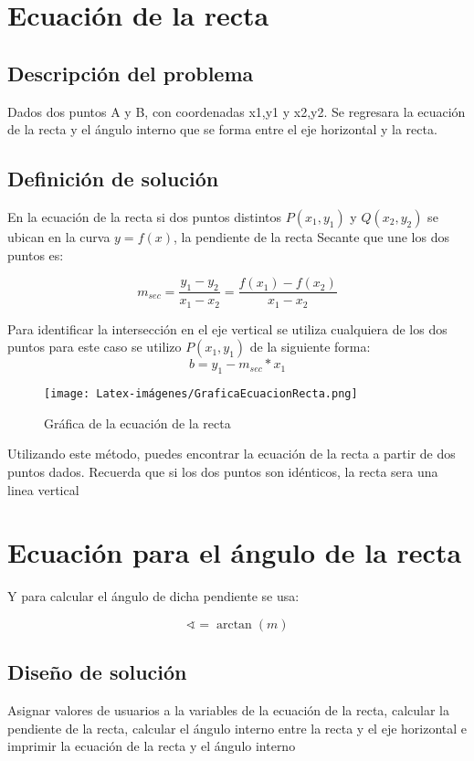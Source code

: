 \section{Ecuación de la recta }
\subsection{Descripción del problema}
Dados dos puntos A y B, con coordenadas x1,y1 y x2,y2. Se regresara la ecuación de la recta y el ángulo interno que se forma entre el eje horizontal y la recta.
\subsection{Definición de solución}
En la ecuación de la recta si dos puntos distintos $P(x_{1},y_{1})$ y $Q(x_{2},y_{2})$ se ubican en la curva $y=f(x)$, la pendiente de la recta Secante que une los dos puntos es:

\begin{equation}
    m_{sec} = \frac{y_{1}-y_{2}}{x_{1}-x_{2}} = \frac{f(x_{1})-f(x_{2})}{x_{1}-x_{2}}
\end{equation}

Para identificar la intersección en el eje vertical se utiliza cualquiera de los dos puntos para este caso se utilizo $P(x_{1},y_{1})$ de la siguiente forma: 
\begin{equation}
    b = y_{1} - m_{sec} * x_{1} 
\end{equation}

\begin{figure}[h!]
    \centerline{\texttt{[image: Latex-imágenes/GraficaEcuacionRecta.png]}}
    \caption{Gráfica de la ecuación de la recta}
    \label{fig}
\end{figure}

Utilizando este método, puedes encontrar la ecuación de la recta a partir de dos puntos dados. Recuerda que si los dos puntos son idénticos, la recta sera una linea vertical\cite{articuloRecta}
\section{Ecuación para el ángulo de la recta}
Y para calcular el ángulo de dicha pendiente se usa: 

\begin{equation}
    \sphericalangle=\arctan(m)
\end{equation}
\subsection{Diseño de solución}
Asignar valores de usuarios a la variables de la ecuación de la recta, calcular la pendiente de la recta, calcular el ángulo interno entre la recta y el eje horizontal e imprimir la ecuación de la recta y el ángulo interno
